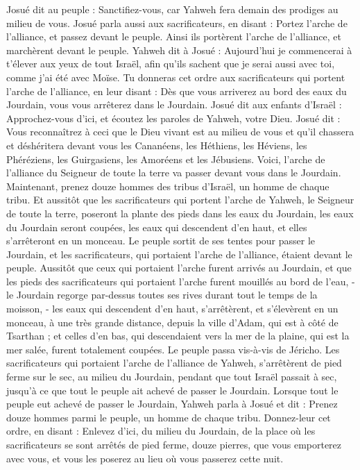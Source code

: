 \begin{multicols}{2}
Josué dit au peuple : Sanctifiez-vous, car Yahweh fera demain des prodiges au milieu de vous.
Josué parla aussi aux sacrificateurs, en disant : Portez l’arche de l’alliance, et passez devant le peuple. Ainsi ils portèrent l’arche de l’alliance, et marchèrent devant le peuple.
Yahweh dit à Josué : Aujourd’hui je commencerai à t’élever aux yeux de tout Israël, afin qu’ils sachent que je serai aussi avec toi, comme j’ai été avec Moïse.
Tu donneras cet ordre aux sacrificateurs qui portent l’arche de l’alliance, en leur disant : Dès que vous arriverez au bord des eaux du Jourdain, vous vous arrêterez dans le Jourdain.
Josué dit aux enfants d’Israël : Approchez-vous d’ici, et écoutez les paroles de Yahweh, votre Dieu.
Josué dit : Vous reconnaîtrez à ceci que le Dieu vivant est au milieu de vous et qu’il chassera et déshéritera devant vous les Cananéens, les Héthiens, les Héviens, les Phéréziens, les Guirgasiens, les Amoréens et les Jébusiens.
Voici, l’arche de l’alliance du Seigneur de toute la terre va passer devant vous dans le Jourdain.
Maintenant, prenez douze hommes des tribus d’Israël, un homme de chaque tribu.
Et aussitôt que les sacrificateurs qui portent l’arche de Yahweh, le Seigneur de toute la terre, poseront la plante des pieds dans les eaux du Jourdain, les eaux du Jourdain seront coupées, les eaux qui descendent d’en haut, et elles s’arrêteront en un monceau.
Le peuple sortit de ses tentes pour passer le Jourdain, et les sacrificateurs, qui portaient l’arche de l’alliance, étaient devant le peuple.
Aussitôt que ceux qui portaient l’arche furent arrivés au Jourdain, et que les pieds des sacrificateurs qui portaient l’arche furent mouillés au bord de l’eau, - le Jourdain regorge par-dessus toutes ses rives durant tout le temps de la moisson, -
les eaux qui descendent d’en haut, s’arrêtèrent, et s’élevèrent en un monceau, à une très grande distance, depuis la ville d’Adam, qui est à côté de Tsarthan ; et celles d’en bas, qui descendaient vers la mer de la plaine, qui est la mer salée, furent totalement coupées. Le peuple passa vis-à-vis de Jéricho.
Les sacrificateurs qui portaient l’arche de l’alliance de Yahweh, s’arrêtèrent de pied ferme sur le sec, au milieu du Jourdain, pendant que tout Israël passait à sec, jusqu’à ce que tout le peuple ait achevé de passer le Jourdain.
\VerseOne{}Lorsque tout le peuple eut achevé de passer le Jourdain, Yahweh parla à Josué et dit :
Prenez douze hommes parmi le peuple, un homme de chaque tribu.
Donnez-leur cet ordre, en disant : Enlevez d’ici, du milieu du Jourdain, de la place où les sacrificateurs se sont arrêtés de pied ferme, douze pierres, que vous emporterez avec vous, et vous les poserez au lieu où vous passerez cette nuit.

\end{multicols}
